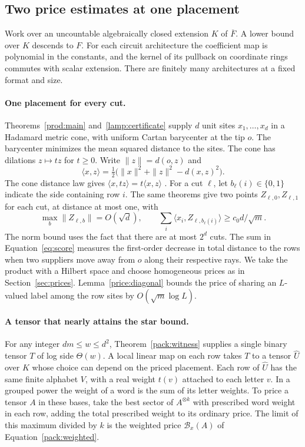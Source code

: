 \subsection{Two price estimates at one placement}

Work over an uncountable algebraically closed extension $K$ of
$\overline F$. A lower bound over $K$ descends to $F$. For each
circuit architecture the coefficient map is polynomial in the
constants, and the kernel of its pullback on coordinate rings
commutes with scalar extension. There are finitely many architectures
at a fixed format and size.

\paragraph{One placement for every cut.}
Theorems~\ref{prod:main} and~\ref{lamp:certificate} supply $d$ unit
sites $x_1,\ldots,x_d$ in a Hadamard metric cone, with uniform
Cartan barycenter at the tip $o$. The barycenter minimizes the mean
squared distance to the sites. The cone has dilations $z\mapsto tz$
for $t\ge0$. Write $\|z\|=d(o,z)$ and
\[
 \langle x,z\rangle=\tfrac12\bigl(\|x\|^2+\|z\|^2-d(x,z)^2\bigr).
\]
The cone distance law gives $\langle x,tz\rangle=t\langle x,z\rangle$
\cite{BH}. For a cut $\ell$, let $b_\ell(i)\in\{0,1\}$ indicate
the side containing row $i$. The same theorems give two points
$Z_{\ell,0},Z_{\ell,1}$ for each cut, at distance at most one, with
\begin{equation}\label{eq:score}
 \max_b\|Z_{\ell,b}\|=O(\sqrt d),\qquad
 \sum_i\langle x_i,Z_{\ell,b_\ell(i)}\rangle
                       \ge c_0 d/\sqrt m .
\end{equation}
The norm bound uses the fact that there are at most $2^d$ cuts.
The sum in Equation~\eqref{eq:score} measures the first-order decrease
in total distance to the rows when two suppliers move away from $o$
along their respective rays. We take the product with a Hilbert space
and choose homogeneous prices as in Section~\ref{sec:prices}.
Lemma~\ref{price:diagonal} bounds the price of sharing an $L$-valued
label among the row sites by $O(\sqrt m\log L)$.

\paragraph{A tensor that nearly attains the star bound.}
For any integer $dm\le w\le d^2$, Theorem~\ref{pack:witness} supplies
a single binary tensor $T$ of log side $\Theta(w)$. A local linear
map on each row takes $T$ to a tensor $\widehat U$ over $K$ whose
choice can depend on the priced placement. Each row of $\widehat U$
has the same finite alphabet $V$, with a real weight $t(v)$ attached
to each letter $v$. In a grouped power the weight of a word is the
sum of its letter weights. To price a tensor $A$ in these bases,
take the best sector of $A^{\otimes k}$ with prescribed word weight
in each row, adding the total prescribed weight to its ordinary
price. The limit of this maximum divided by $k$ is the weighted price
$\mathcal B_x(A)$ of Equation~\eqref{pack:weighted}.


